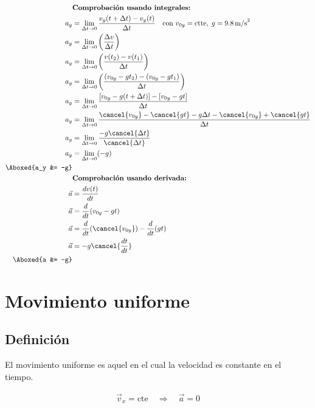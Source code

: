 \begin{align*}
&\textbf{Comprobación usando integrales:} \\
    a_y &= \lim_{\Delta t \to 0} \frac{v_y(t+\Delta t) - v_y(t)}{\Delta t}
    \quad \text{con } v_{0y}=\text{ctte},\; g=9.8\,\text{m/s}^2 \\
    a_y &= \lim_{\Delta t \to 0} \left(\frac{\Delta v}{\Delta t}\right) \\
    a_y &= \lim_{\Delta t \to 0} \left(\frac{v(t_2) - v(t_1)}{\Delta t}\right) \\
    a_y &= \lim_{\Delta t \to 0} \left(\frac{(v_{0y} - gt_2)-(v_{0y} - gt_1)}{\Delta t}\right) \\
    a_y &= \lim_{\Delta t \to 0} \frac{[v_{0y} - g(t+\Delta t)] - [v_{0y} - gt]}{\Delta t} \\
    a_y &= \lim_{\Delta t \to 0} \frac{\cancel{v_{0y}} - \cancel{gt} - g\Delta t - \cancel{v_{0y}} + \cancel{gt}}{\Delta t} \\
    a_y &= \lim_{\Delta t \to 0} \frac{-g\cancel{\Delta t}}{\cancel{\Delta t}} \\
    a_y &= \lim_{\Delta t \to 0} (-g) \\
    \Aboxed{a_y &= -g} \\
&\textbf{Comprobación usando derivada:} \\
    \vec{a} &= \frac{dv(t)}{dt} \\
    \vec{a} &= \frac{d}{dt}(v_{0y}-gt) \\
    \vec{a} &= \frac{d}{dt}(\cancel{v_{0y}}) - \frac{d}{dt}(gt)\\
    \vec{a} &= -g \cancel{\frac{dt}{dt}}\\
    \Aboxed{a &= -g}
\end{align*}


\section{Movimiento uniforme}

\subsection{Definición}
El movimiento uniforme es aquel en el cual la velocidad es constante en el tiempo.
\vspace{-20pt}

\begin{align*}
\vec{v}_x = \text{cte} \quad \Rightarrow \quad \vec{a} = 0
\end{align*}

